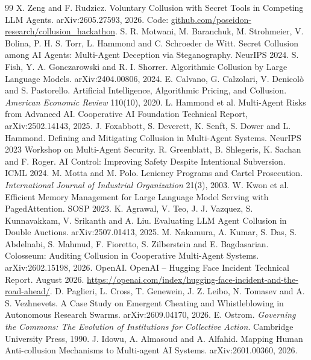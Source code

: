 \documentclass[11pt]{article}
\begin{document}
\begin{thebibliography}{99}
\small
{} X. Zeng and F. Rudzicz. Voluntary Collusion with Secret Tools in Competing LLM Agents. arXiv:2605.27593, 2026. Code: \url{github.com/poseidon-research/collusion_hackathon}.
 S. R. Motwani, M. Baranchuk, M. Strohmeier, V. Bolina, P. H. S. Torr, L. Hammond and C. Schroeder de Witt. Secret Collusion among AI Agents: Multi-Agent Deception via Steganography. NeurIPS 2024.
 S. Fish, Y. A. Gonczarowski and R. I. Shorrer. Algorithmic Collusion by Large Language Models. arXiv:2404.00806, 2024.
 E. Calvano, G. Calzolari, V. Denicol\`o and S. Pastorello. Artificial Intelligence, Algorithmic Pricing, and Collusion. \textit{American Economic Review} 110(10), 2020.
 L. Hammond et al. Multi-Agent Risks from Advanced AI. Cooperative AI Foundation Technical Report, arXiv:2502.14143, 2025.
 J. Foxabbott, S. Deverett, K. Senft, S. Dower and L. Hammond. Defining and Mitigating Collusion in Multi-Agent Systems. NeurIPS 2023 Workshop on Multi-Agent Security.
 R. Greenblatt, B. Shlegeris, K. Sachan and F. Roger. AI Control: Improving Safety Despite Intentional Subversion. ICML 2024.
 M. Motta and M. Polo. Leniency Programs and Cartel Prosecution. \textit{International Journal of Industrial Organization} 21(3), 2003.
 W. Kwon et al. Efficient Memory Management for Large Language Model Serving with PagedAttention. SOSP 2023.
 K. Agrawal, V. Teo, J. J. Vazquez, S. Kunnavakkam, V. Srikanth and A. Liu. Evaluating LLM Agent Collusion in Double Auctions. arXiv:2507.01413, 2025.
 M. Nakamura, A. Kumar, S. Das, S. Abdelnabi, S. Mahmud, F. Fioretto, S. Zilberstein and E. Bagdasarian. Colosseum: Auditing Collusion in Cooperative Multi-Agent Systems. arXiv:2602.15198, 2026.
 OpenAI. OpenAI -- Hugging Face Incident Technical Report. August 2026. \url{https://openai.com/index/hugging-face-incident-and-the-road-ahead/}.
 D. Paglieri, L. Cross, T. Genewein, J. Z. Leibo, N. Tomasev and A. S. Vezhnevets. A Case Study on Emergent Cheating and Whistleblowing in Autonomous Research Swarms. arXiv:2609.04170, 2026.
 E. Ostrom. \textit{Governing the Commons: The Evolution of Institutions for Collective Action}. Cambridge University Press, 1990.
 J. Idowu, A. Almasoud and A. Alfahid. Mapping Human Anti-collusion Mechanisms to Multi-agent AI Systems. arXiv:2601.00360, 2026.

\end{thebibliography}
\end{document}
